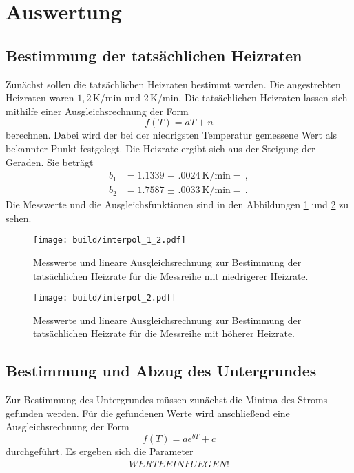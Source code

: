 \section{Auswertung}
\label{sec:Auswertung}

\subsection{Bestimmung der tatsächlichen Heizraten}
Zunächst sollen die tatsächlichen Heizraten bestimmt werden. Die angestrebten
Heizraten waren $1{,}2\,$K/min und 2\,K/min. Die tatsächlichen Heizraten lassen
sich mithilfe einer Ausgleichsrechnung der Form
\begin{equation*}
  f(T)=aT+n
\end{equation*}
berechnen. Dabei wird der bei der niedrigsten Temperatur gemessene Wert als bekannter
Punkt festgelegt. Die Heizrate ergibt sich aus der Steigung der Geraden. Sie beträgt
\begin{align*}
  b_1&=\SI{1.1339(0024)}{\kelvin\per\minute}= \,, \\
  b_2&=\SI{1.7587(0033)}{\kelvin\per\minute}= \,.
\end{align*}
Die Messwerte und die Ausgleichsfunktionen sind in den Abbildungen \ref{fig:heiz1}
und \ref{fig:heiz2} zu sehen.

\begin{figure}
  \centering
  \texttt{[image: build/interpol\_1\_2.pdf]}
  \caption{Messwerte und lineare Ausgleichsrechnung zur Bestimmung der tatsächlichen
  Heizrate für die Messreihe mit niedrigerer Heizrate.}
  \label{fig:heiz1}
\end{figure}
\begin{figure}
  \centering
  \texttt{[image: build/interpol\_2.pdf]}
  \caption{Messwerte und lineare Ausgleichsrechnung zur Bestimmung der tatsächlichen
  Heizrate für die Messreihe mit höherer Heizrate.}
  \label{fig:heiz2}
\end{figure}


\subsection{Bestimmung und Abzug des Untergrundes}

Zur Bestimmung des Untergrundes müssen zunächst die Minima des Stroms gefunden
werden. Für die gefundenen Werte wird anschließend eine Ausgleichsrechnung der
Form
\begin{equation*}
  f(T)=a e^{bT} +c
\end{equation*}
durchgeführt. Es ergeben sich die Parameter
\begin{align*}
  WERTE EINFUEGEN!
\end{align*}

